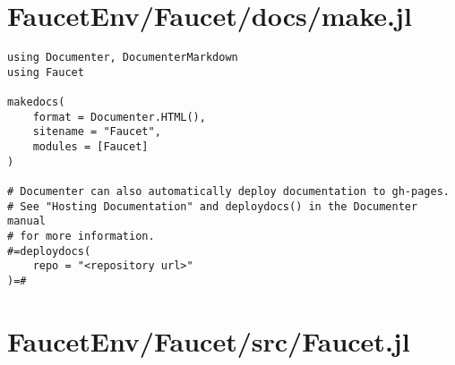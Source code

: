 \section{FaucetEnv/Faucet/docs/make.jl}
\begin{lstlisting}[language=JuliaLocal, style=julia]
using Documenter, DocumenterMarkdown
using Faucet

makedocs(
    format = Documenter.HTML(),
    sitename = "Faucet",
    modules = [Faucet]
)

# Documenter can also automatically deploy documentation to gh-pages.
# See "Hosting Documentation" and deploydocs() in the Documenter manual
# for more information.
#=deploydocs(
    repo = "<repository url>"
)=#

\end{lstlisting}
\section{FaucetEnv/Faucet/src/Faucet.jl}
